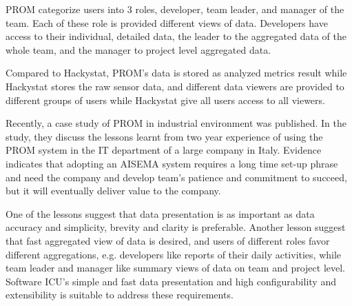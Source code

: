 PROM categorize users into 3 roles, developer, team leader, and manager of the team. Each of these role is provided different views of data. Developers have access to their individual, detailed data, the leader to the aggregated data of the whole team, and the manager to project level aggregated data.

Compared to Hackystat, PROM's data is stored as analyzed metrics result while Hackystat stores the raw sensor data, and different data viewers are provided to different groups of users while Hackystat give all users access to all viewers.

Recently, a case study of PROM in industrial environment was published\cite{prom09}. In the study, they discuss the lessons learnt from two year experience of using the PROM system in the IT department of a large company in Italy. Evidence indicates that adopting an AISEMA system requires a long time set-up phrase and need the company and develop team's patience and commitment to succeed, but it will eventually deliver value to the company. 

One of the lessons suggest that data presentation is as important as data accuracy and simplicity, brevity and clarity is preferable. Another lesson suggest that fast aggregated view of data is desired, and users of different roles favor different aggregations, e.g. developers like reports of their daily activities, while team leader and manager like summary views of data on team and project level. Software ICU's simple and fast data presentation and high configurability and extensibility is suitable to address these requirements.



